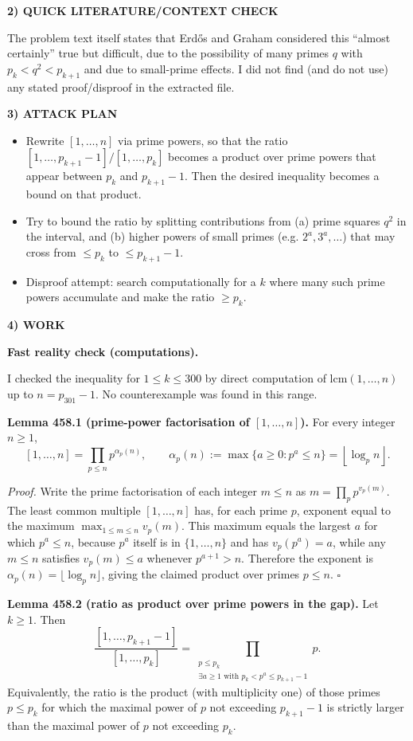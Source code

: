 \noindent\textbf{2) QUICK LITERATURE/CONTEXT CHECK}

The problem text itself states that Erd\H{o}s and Graham considered this ``almost certainly'' true but difficult, due to the possibility of many primes $q$ with $p_k<q^2<p_{k+1}$ and due to small-prime effects. I did not find (and do not use) any stated proof/disproof in the extracted file.

\noindent\textbf{3) ATTACK PLAN}

\begin{itemize}
\item Rewrite $[1,\dots,n]$ via prime powers, so that the ratio
$[1,\dots,p_{k+1}-1]/[1,\dots,p_k]$
becomes a product over prime powers that appear between $p_k$ and $p_{k+1}-1$.
Then the desired inequality becomes a bound on that product.
\item Try to bound the ratio by splitting contributions from (a) prime squares $q^2$ in the interval, and (b) higher powers of small primes (e.g. $2^a,3^a,\dots$) that may cross from $\le p_k$ to $\le p_{k+1}-1$.
\item Disproof attempt: search computationally for a $k$ where many such prime powers accumulate and make the ratio $\ge p_k$.
\end{itemize}

\noindent\textbf{4) WORK}

\textbf{Fast reality check (computations).}

I checked the inequality for $1\le k\le 300$ by direct computation of $\mathrm{lcm}(1,\dots,n)$ up to $n=p_{301}-1$. No counterexample was found in this range.

\medskip
\noindent\textbf{Lemma 458.1 (prime-power factorisation of $[1,\dots,n]$).}
For every integer $n\ge 1$,
\[[1,\dots,n] = \prod_{p\le n} p^{\alpha_p(n)},\qquad \alpha_p(n):=\max\{a\ge 0: p^a\le n\}=\left\lfloor \log_p n\right\rfloor.
\]

\textit{Proof.}
Write the prime factorisation of each integer $m\le n$ as $m=\prod_{p} p^{v_p(m)}$.
The least common multiple $[1,\dots,n]$ has, for each prime $p$, exponent equal to the maximum $\max_{1\le m\le n} v_p(m)$. This maximum equals the largest $a$ for which $p^a\le n$, because $p^a$ itself is in $\{1,\dots,n\}$ and has $v_p(p^a)=a$, while any $m\le n$ satisfies $v_p(m)\le a$ whenever $p^{a+1}>n$. Therefore the exponent is $\alpha_p(n)=\lfloor\log_p n\rfloor$, giving the claimed product over primes $p\le n$. \hfill$\square$

\medskip
\noindent\textbf{Lemma 458.2 (ratio as product over prime powers in the gap).}
Let $k\ge 1$. Then
\[\frac{[1,\dots,p_{k+1}-1]}{[1,\dots,p_k]} = \prod_{\substack{p\le p_k\\ \exists a\ge 1\text{ with }p_k < p^a\le p_{k+1}-1}} p.
\]
Equivalently, the ratio is the product (with multiplicity one) of those primes $p\le p_k$ for which the maximal power of $p$ not exceeding $p_{k+1}-1$ is strictly larger than the maximal power of $p$ not exceeding $p_k$.

